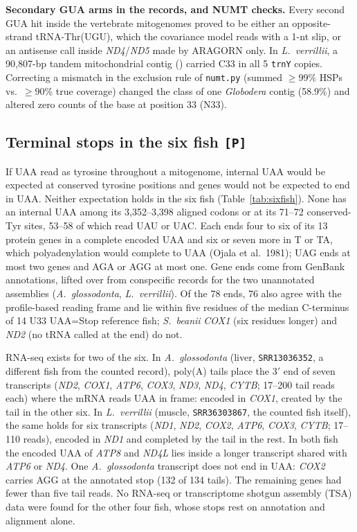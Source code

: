 \documentclass[11pt, a4paper]{article}
\begin{document}
\textbf{Secondary GUA arms in the records, and NUMT checks.} Every second GUA hit inside the vertebrate mitogenomes proved to be either an opposite-strand tRNA-Thr(UGU), which the covariance model reads with a 1-nt slip, or an antisense call inside \textit{ND4}/\textit{ND5} made by ARAGORN only. In \textit{L.\ verrillii}, a 90,807-bp tandem mitochondrial contig () carried C33 in all 5 \texttt{trnY} copies. Correcting a mismatch in the exclusion rule of \texttt{numt.py} (summed $\ge 99\%$ HSPs vs.\ $\ge 90\%$ true coverage) changed the class of one \textit{Globodera} contig (58.9\%) and altered zero counts of the base at position 33 (N33).

\subsection{Terminal stops in the six fish \texttt{[P]}}\label{sec:stops}
If UAA read as tyrosine throughout a mitogenome, internal UAA would be expected at conserved tyrosine positions and genes would not be expected to end in UAA. Neither expectation holds in the six fish (Table~\ref{tab:sixfish}). None has an internal UAA among its 3,352--3,398 aligned codons or at its 71--72 conserved-Tyr sites, 53--58 of which read UAU or UAC. Each ends four to six of its 13 protein genes in a complete encoded UAA and six or seven more in T or TA, which polyadenylation would complete to UAA (Ojala et al.\ 1981); UAG ends at most two genes and AGA or AGG at most one. Gene ends come from GenBank annotations, lifted over from conspecific records for the two unannotated assemblies (\textit{A.\ glossodonta}, \textit{L.\ verrillii}). Of the 78 ends, 76 also agree with the profile-based reading frame and lie within five residues of the median C-terminus of 14 U33 UAA=Stop reference fish; \textit{S.\ beanii} \textit{COX1} (six residues longer) and \textit{ND2} (no tRNA called at the end) do not.

RNA-seq exists for two of the six. In \textit{A.\ glossodonta} (liver, \texttt{SRR13036352}, a different fish from the counted record), poly(A) tails place the 3$'$ end of seven transcripts (\textit{ND2}, \textit{COX1}, \textit{ATP6}, \textit{COX3}, \textit{ND3}, \textit{ND4}, \textit{CYTB}; 17--200 tail reads each) where the mRNA reads UAA in frame: encoded in \textit{COX1}, created by the tail in the other six. In \textit{L.\ verrillii} (muscle, \texttt{SRR36303867}, the counted fish itself), the same holds for six transcripts (\textit{ND1}, \textit{ND2}, \textit{COX2}, \textit{ATP6}, \textit{COX3}, \textit{CYTB}; 17--110 reads), encoded in \textit{ND1} and completed by the tail in the rest. In both fish the encoded UAA of \textit{ATP8} and \textit{ND4L} lies inside a longer transcript shared with \textit{ATP6} or \textit{ND4}. One \textit{A.\ glossodonta} transcript does not end in UAA: \textit{COX2} carries AGG at the annotated stop (132 of 134 tails). The remaining genes had fewer than five tail reads. No RNA-seq or transcriptome shotgun assembly (TSA) data were found for the other four fish, whose stops rest on annotation and alignment alone.
\end{document}
